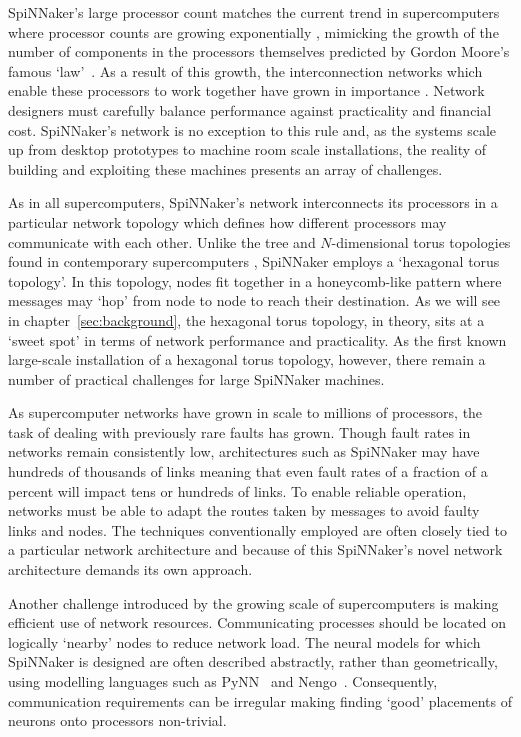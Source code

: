 SpiNNaker's large processor count matches the current trend in supercomputers
where processor counts are growing exponentially \cite{meuer16j}, mimicking the
growth of the number of components in the processors themselves predicted by
Gordon Moore's famous `law'~\cite{moore75}. As a result of this growth, the
interconnection networks which enable these processors to work together have
grown in importance \cite{dally01}. Network designers must carefully balance
performance against practicality and financial cost.  SpiNNaker's network is no
exception to this rule and, as the systems scale up from desktop prototypes to
machine room scale installations, the reality of building and exploiting these
machines presents an array of challenges.

As in all supercomputers, SpiNNaker's network interconnects its processors in
a particular network topology which defines how different processors may
communicate with each other. Unlike the tree and $N$-dimensional torus
topologies found in contemporary supercomputers \cite[chapter~3]{dally04},
SpiNNaker employs a `hexagonal torus topology'. In this topology, nodes fit
together in a honeycomb-like pattern where messages may `hop' from node to node
to reach their destination. As we will see in chapter~\ref{sec:background}, the
hexagonal torus topology, in theory, sits at a `sweet spot' in terms of network
performance and practicality. As the first known large-scale installation of a
hexagonal torus topology, however, there remain a number of practical
challenges for large SpiNNaker machines.

As supercomputer networks have grown in scale to millions of processors, the
task of dealing with previously rare faults has grown.  Though fault rates in
networks remain consistently low, architectures such as SpiNNaker may have
hundreds of thousands of links meaning that even fault rates of a fraction of a
percent will impact tens or hundreds of links. To enable reliable operation,
networks must be able to adapt the routes taken by messages to avoid faulty
links and nodes. The techniques conventionally employed are often closely tied
to a particular network architecture and because of this SpiNNaker's novel
network architecture demands its own approach.

Another challenge introduced by the growing scale of supercomputers is making
efficient use of network resources. Communicating processes should be located
on logically `nearby' nodes to reduce network load. The neural models for which
SpiNNaker is designed are often described abstractly, rather than
geometrically, using modelling languages such as PyNN~\cite{davison08} and
Nengo~\cite{bekolay13b}.  Consequently, communication requirements can be
irregular making finding `good' placements of neurons onto processors
non-trivial.

